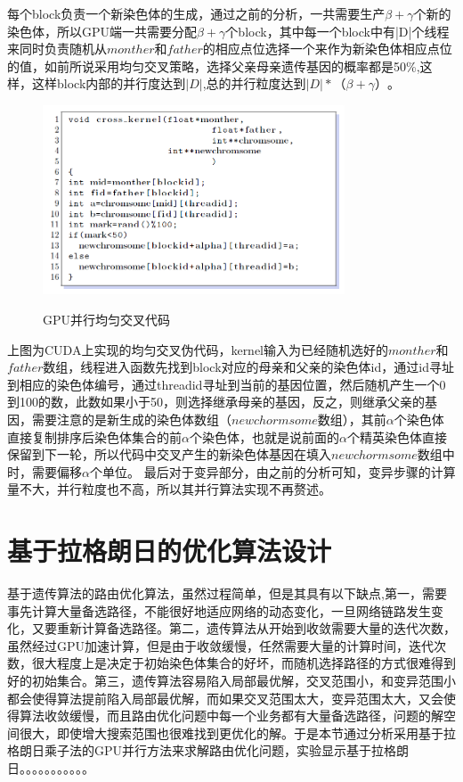   每个block负责一个新染色体的生成，通过之前的分析，一共需要生产$\beta+\gamma$个新的染色体，所以GPU端一共需要分配$\beta+\gamma$个block，其中每一个block中有|D|个线程来同时负责随机从$monther$和$father$的相应点位选择一个来作为新染色体相应点位的值，如前所说采用均匀交叉策略，选择父亲母亲遗传基因的概率都是50\%,这样，这样block内部的并行度达到$|D|$,总的并行粒度达到$|D|*（\beta+\gamma）$。
\begin{figure}
  \begin{center}
    {\includegraphics[width=0.8\textwidth]{figures/crosscode.png}}
    \end{center}
  \caption{{\footnotesize{GPU并行均匀交叉代码}}}
  \label{IterNum}
\end{figure}
  上图为CUDA上实现的均匀交叉伪代码，kernel输入为已经随机选好的$monther$和$father$数组，线程进入函数先找到block对应的母亲和父亲的染色体id，通过id寻址到相应的染色体编号，通过threadid寻址到当前的基因位置，然后随机产生一个0到100的数，此数如果小于50，则选择继承母亲的基因，反之，则继承父亲的基因，需要注意的是新生成的染色体数组（$newchormsome$数组），其前$\alpha$个染色体直接复制排序后染色体集合的前$\alpha$个染色体，也就是说前面的$\alpha$个精英染色体直接保留到下一轮，所以代码中交叉产生的新染色体基因在填入$newchormsome$数组中时，需要偏移$\alpha$个单位。
  最后对于变异部分，由之前的分析可知，变异步骤的计算量不大，并行粒度也不高，所以其并行算法实现不再赘述。
\section{基于拉格朗日的优化算法设计}
  基于遗传算法的路由优化算法，虽然过程简单，但是其具有以下缺点,第一，需要事先计算大量备选路径，不能很好地适应网络的动态变化，一旦网络链路发生变化，又要重新计算备选路径。第二，遗传算法从开始到收敛需要大量的迭代次数，虽然经过GPU加速计算，但是由于收敛缓慢，任然需要大量的计算时间，迭代次数，很大程度上是决定于初始染色体集合的好坏，而随机选择路径的方式很难得到好的初始集合。第三，遗传算法容易陷入局部最优解，交叉范围小，和变异范围小都会使得算法提前陷入局部最优解，而如果交叉范围太大，变异范围太大，又会使得算法收敛缓慢，而且路由优化问题中每一个业务都有大量备选路径，问题的解空间很大，即使增大搜索范围也很难找到更优化的解。于是本节通过分析采用基于拉格朗日乘子法的GPU并行方法来求解路由优化问题，实验显示基于拉格朗日。。。。。。。。。。。
